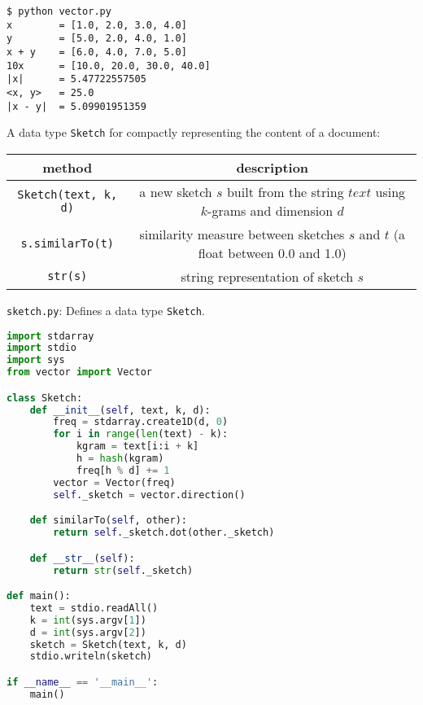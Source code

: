 \documentclass[8pt,a4paper,compress,handout]{beamer}
\begin{document}
\begin{frame}[fragile]
\begin{lstlisting}[language={}]
$ python vector.py
x        = [1.0, 2.0, 3.0, 4.0]
y        = [5.0, 2.0, 4.0, 1.0]
x + y    = [6.0, 4.0, 7.0, 5.0]
10x      = [10.0, 20.0, 30.0, 40.0]
|x|      = 5.47722557505
<x, y>   = 25.0
|x - y|  = 5.09901951359
\end{lstlisting}
\end{frame}

\begin{frame}[fragile]
A data type \lstinline{Sketch} for compactly representing the content of a document:
\begin{center}
\begin{tabular}{cc}
method & description \\ \hline
\lstinline$Sketch(text, k, d)$ & \makecell{a new sketch $s$ built from the string $text$ \\ using $k$-grams and dimension $d$} \\
\lstinline$s.similarTo(t)$ & \makecell{similarity measure between sketches $s$ and $t$ (a float \\ between 0.0 and 1.0)} \\
\lstinline$str(s)$ & string representation of sketch $s$
\end{tabular} 
\end{center}
\end{frame}

\begin{frame}[fragile]
\begin{framed}
\tiny \lstinline{sketch.py}: Defines a data type \lstinline{Sketch}. 
\end{framed}

\begin{lstlisting}[language=Python]
import stdarray
import stdio
import sys
from vector import Vector

class Sketch:
    def __init__(self, text, k, d):
        freq = stdarray.create1D(d, 0)
        for i in range(len(text) - k):
            kgram = text[i:i + k]
            h = hash(kgram)
            freq[h % d] += 1
        vector = Vector(freq)
        self._sketch = vector.direction()

    def similarTo(self, other):
        return self._sketch.dot(other._sketch)

    def __str__(self):
        return str(self._sketch)

def main():
    text = stdio.readAll()
    k = int(sys.argv[1])
    d = int(sys.argv[2])
    sketch = Sketch(text, k, d)
    stdio.writeln(sketch)

if __name__ == '__main__':
    main()
\end{lstlisting}
\end{frame}
\end{document}
